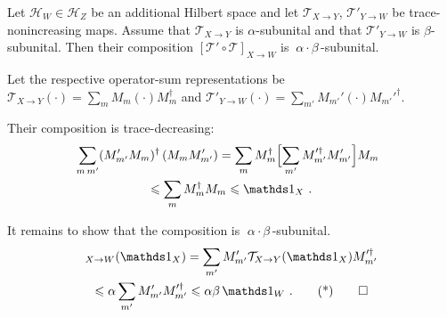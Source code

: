 \documentclass[12pt,a4paper]{article}
\def\Hs{\mathscr{H}}%
\newenvironment{myproof}[1][\proofname]{%
  \color{prooftextcolor} \footnotesize \proof[\itshape #1]\hspace*{1.2mm}%
}{\endproof}
\begin{document}
\begin{prop}
  \label{prop:CompositionOfAlphaSubunitalMaps}
  Let $\Hs_W\in\Hs_Z$ be an additional Hilbert space and let $\mathcal{T}_{X\rightarrow Y}$,
  $\mathcal{T}'_{Y\rightarrow W}$ be trace-nonincreasing maps. Assume that $\mathcal{T}_{X\rightarrow Y}$ is
  $\alpha$-subunital and that $\mathcal{T}'_{Y\rightarrow W}$ is $\beta$-subunital. Then their composition
  $\left[\mathcal{T}'\circ\mathcal{T}\right]_{X\rightarrow W}$ is $\:\alpha\cdot\beta\,$-subunital.
\end{prop}
\begin{myproof}[Proof of Prop.~\ref{prop:CompositionOfAlphaSubunitalMaps}]
  Let the respective operator-sum representations be
  $\mathcal{T}_{X\rightarrow Y}(\cdot) = \sum_m M_m \left(\cdot\right) M_m^\dagger$ and
  $\mathcal{T}'_{Y\rightarrow W}(\cdot) = \sum_{m'} M_{m'}' \left(\cdot\right) M_{m'}'^\dagger$.

  Their composition is trace-decreasing:
  \begin{multline*}
    \hspace*{-2mm}\sum_{m\,m'} (M_{m'}' M_m)^\dagger \, (M_m M_{m'}')
    = \sum_m M_m^\dagger \Bigl[ \sum_{m'} M_{m'}'^\dagger M_{m'}' \Bigr] M_m \\
    \leqslant \sum_m M_m^\dagger M_m
    \leqslant \Ident_X\ .
  \end{multline*}

  It remains to show that the composition is $\;\alpha\cdot\beta\,$-subunital.
  \begin{multline*}
    [\mathcal{T}'\circ\mathcal{T}]_{X\rightarrow W}(\Ident_X)
    = \sum_{m'} M_{m'}' \mathcal{T}_{X\rightarrow Y}(\Ident_X) M_{m'}'^\dagger \\
    \leqslant \alpha \sum_{m'} M_{m'}' M_{m'}'^\dagger \leqslant \alpha\beta\,\Ident_W\ . \tag*\qedhere
  \end{multline*}
\end{myproof}
\end{document}
